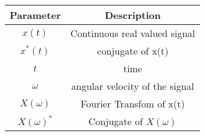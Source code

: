 \renewcommand{\arraystretch}{1.5}
\begin{tabular}{|c|c|}
\hline
Parameter & Description  \\\hline
\( x(t) \) & Continuous real valued signal  \\\hline
\(x^*(t) \) & conjugate of x(t) \\\hline
\(t \) & time \\\hline
\(\omega \) & angular velocity of the signal \\\hline
\(X(\omega)\)& Fourier Transfom of x(t)\\\hline
\(X(\omega)^*\) & Conjugate of \(X(\omega)\) \\ \hline
\end{tabular}

